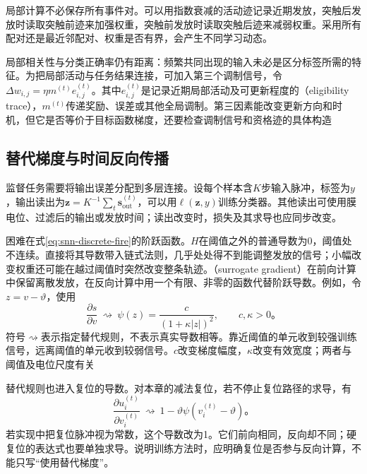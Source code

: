 局部计算不必保存所有事件对。可以用指数衰减的活动迹记录近期发放，突触后发放时读取突触前迹来加强权重，突触前发放时读取突触后迹来减弱权重。采用所有配对还是最近邻配对、权重是否有界，会产生不同学习动态。

局部相关性与分类正确率仍有距离：频繁共同出现的输入未必是区分标签所需的特征。为把局部活动与任务结果连接，可加入第三个调制信号，令$\Delta w_{i,j}=\eta m^{(t)}e_{i,j}^{(t)}$。其中$e_{i,j}^{(t)}$是记录近期局部活动及可更新程度的（eligibility trace），$m^{(t)}$传递奖励、误差或其他全局调制。第三因素能改变更新方向和时机，但它是否等价于目标函数梯度，还要检查调制信号和资格迹的具体构造

\subsection{替代梯度与时间反向传播}
\label{sec:snn-surrogate}

监督任务需要将输出误差分配到多层连接。设每个样本含$K$步输入脉冲，标签为$y$，输出读出为$\bm z=K^{-1}\sum_t\bm s_{\mathrm{out}}^{(t)}$，可以用$\ell(\bm z,y)$训练分类器。其他读出可使用膜电位、过滤后的输出或发放时间；读出改变时，损失及其求导也应同步改变。

困难在式\eqref{eq:snn-discrete-fire}的阶跃函数。$H$在阈值之外的普通导数为0，阈值处不连续。直接将其导数带入链式法则，几乎处处得不到能调整发放的信号；小幅改变权重还可能在越过阈值时突然改变整条轨迹。（surrogate gradient）在前向计算中保留离散发放，在反向计算中用一个有限、非零的函数代替阶跃导数。例如，令$z=v-\vartheta$，使用
\begin{equation}
  \frac{\partial s}{\partial v}\ \rightsquigarrow\
  \psi(z)=\frac{c}{(1+\kappa|z|)^2},\qquad c,\kappa>0\text{。}
  \label{eq:snn-surrogate-derivative}
\end{equation}
符号$\rightsquigarrow$表示指定替代规则，不表示真实导数相等。靠近阈值的单元收到较强训练信号，远离阈值的单元收到较弱信号。$c$改变梯度幅度，$\kappa$改变有效宽度；两者与阈值及电位尺度有关

替代规则也进入复位的导数。对本章的减法复位，若不停止复位路径的求导，有
\begin{equation}
  \frac{\partial u_i^{(t)}}{\partial v_i^{(t)}}
  \ \rightsquigarrow\ 1-\vartheta\psi(v_i^{(t)}-\vartheta)\text{。}
  \label{eq:snn-reset-gradient}
\end{equation}
若实现中把复位脉冲视为常数，这个导数改为1。它们前向相同，反向却不同；硬复位的表达式也要单独求导。说明训练方法时，应明确复位是否参与反向计算，不能只写“使用替代梯度”。

